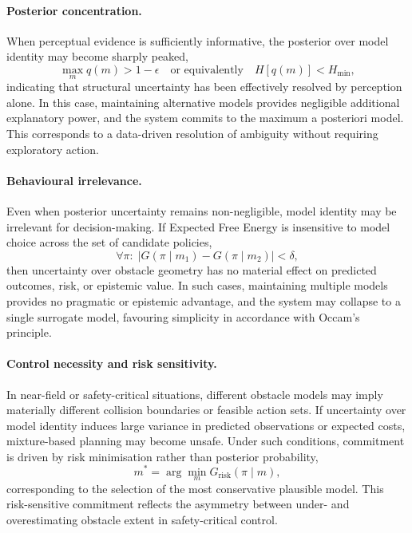 \documentclass[a4paper, twoside]{article}
\begin{document}
\paragraph{Posterior concentration.}
When perceptual evidence is sufficiently informative, the posterior over model identity
may become sharply peaked,
\begin{equation}
\max_{m} q(m) > 1 - \epsilon
\quad \text{or equivalently} \quad
H[q(m)] < H_{\min},
\label{eq:posterior_concentration}
\end{equation}
indicating that structural uncertainty has been effectively resolved by perception alone.
In this case, maintaining alternative models provides negligible additional explanatory
power, and the system commits to the maximum a posteriori model.
This corresponds to a data-driven resolution of ambiguity without requiring exploratory
action.

\paragraph{Behavioural irrelevance.}
Even when posterior uncertainty remains non-negligible, model identity may be irrelevant
for decision-making.
If Expected Free Energy is insensitive to model choice across the set of candidate policies,
\begin{equation}
\forall \pi:\;
\big| G(\pi \mid m_1) - G(\pi \mid m_2) \big| < \delta,
\label{eq:behavioral_irrelevance}
\end{equation}
then uncertainty over obstacle geometry has no material effect on predicted outcomes,
risk, or epistemic value.
In such cases, maintaining multiple models provides no pragmatic or epistemic advantage,
and the system may collapse to a single surrogate model, favouring simplicity in accordance
with Occam's principle.

\paragraph{Control necessity and risk sensitivity.}
In near-field or safety-critical situations, different obstacle models may imply materially
different collision boundaries or feasible action sets.
If uncertainty over model identity induces large variance in predicted observations or
expected costs, mixture-based planning may become unsafe.
Under such conditions, commitment is driven by risk minimisation rather than posterior
probability,
\begin{equation}
m^{\ast}
=
\arg\min_{m}
G_{\text{risk}}(\pi \mid m),
\label{eq:risk_sensitive_commitment}
\end{equation}
corresponding to the selection of the most conservative plausible model.
This risk-sensitive commitment reflects the asymmetry between under- and overestimating
obstacle extent in safety-critical control.
\end{document}
